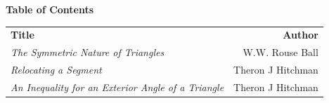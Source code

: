 \documentclass{report}
\begin{document}
\center \Large \textbf{Table of Contents}\\[.5in]
\normalsize
\begin{tabular}{lr}
\textbf{Title} & \textbf{Author}\\[.25in]
\emph{The Symmetric Nature of Triangles} & W.W. Rouse Ball \\[.25in]
\emph{Relocating a Segment} & Theron J Hitchman \\[.25in]
\emph{An Inequality for an Exterior Angle of a Triangle} & Theron J Hitchman \\[.25in]
\end{tabular}




%
%
%
%
%
%
%
%
%
\end{document}
